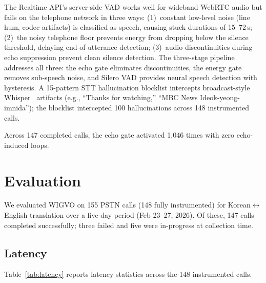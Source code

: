 \documentclass[11pt]{article}
\begin{document}
The Realtime API's server-side VAD works well for wideband WebRTC audio but fails on the telephone network in three ways: (1)~constant low-level noise (line hum, codec artifacts) is classified as speech, causing stuck durations of 15--72\,s; (2)~the noisy telephone floor prevents energy from dropping below the silence threshold, delaying end-of-utterance detection; (3)~audio discontinuities during echo suppression prevent clean silence detection. The three-stage pipeline addresses all three: the echo gate eliminates discontinuities, the energy gate removes sub-speech noise, and Silero VAD provides neural speech detection with hysteresis. A 15-pattern STT hallucination blocklist intercepts broadcast-style Whisper~\citep{whisper_radford_2023} artifacts (e.g., ``Thanks for watching,'' ``MBC News Ideok-yeong-imnida''); the blocklist intercepted 100 hallucinations across 148 instrumented calls.

Across 147 completed calls, the echo gate activated 1{,}046 times with zero echo-induced loops.

\section{Evaluation}
\label{sec:evaluation}

We evaluated WIGVO on 155 PSTN calls (148 fully instrumented) for Korean$\leftrightarrow$English translation over a five-day period (Feb 23--27, 2026). Of these, 147 calls completed successfully; three failed and five were in-progress at collection time.

\subsection{Latency}

Table~\ref{tab:latency} reports latency statistics across the 148 instrumented calls.
\end{document}
